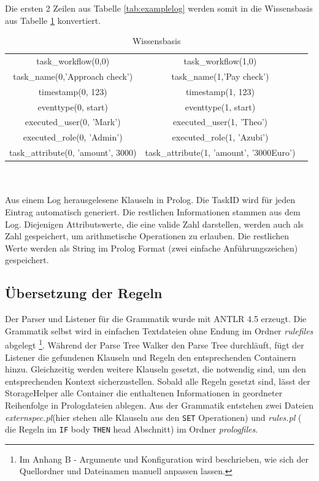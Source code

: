 Die ersten 2 Zeilen aus Tabelle \ref{tab:examplelog} werden somit in die Wissensbasis aus Tabelle \ref{tab:knowledge} konvertiert.
\begin{table}[h!]
\begin{tabular}{ccc}
task{\_}workflow(0,0)&task{\_}workflow(1,0)\\
task{\_}name(0,'Approach check')&task{\_}name(1,'Pay check')\\
timestamp(0, 123)&timestamp(1, 123)\\
eventtype(0, start)&eventtype(1, start)\\
executed{\_}user(0, 'Mark')&executed{\_}user(1, 'Theo')\\
executed{\_}role(0, 'Admin')&executed{\_}role(1, 'Azubi')\\
task\_attribute(0, 'amount', 3000)& task\_attribute(1, 'amount', '3000Euro')\\
\end{tabular}\\\\
\small Aus einem Log herausgelesene Klauseln in Prolog. Die TaskID wird für jeden Eintrag automatisch generiert. Die restlichen Informationen stammen aus dem Log. Diejenigen Attributswerte, die eine valide Zahl darstellen, werden auch als Zahl gespeichert, um arithmetische Operationen zu erlauben. Die restlichen Werte werden als String im Prolog Format (zwei einfache Anführungszeichen) gespeichert. 
\caption{Wissensbasis}
\label{tab:knowledge}
\end{table}


%
%
\subsection{Übersetzung der Regeln}
\label{sec:constraintreader}

Der Parser und Listener für die Grammatik wurde mit ANTLR 4.5 \cite{antlr} erzeugt. Die Grammatik selbst wird in einfachen Textdateien ohne Endung im Ordner \textit{rulefiles} abgelegt \footnote{Im Anhang B - Argumente und Konfiguration wird beschrieben, wie sich der Quellordner und Dateinamen manuell anpassen lassen.}. Während der Parse Tree Walker den Parse Tree durchläuft, fügt der Listener die gefundenen Klauseln und Regeln den entsprechenden Containern hinzu. Gleichzeitig werden weitere Klauseln gesetzt, die notwendig sind, um den entsprechenden Kontext sicherzustellen. Sobald alle Regeln gesetzt sind, lässt der StorageHelper alle Container die enthaltenen Informationen in geordneter Reihenfolge in Prologdateien ablegen. Aus der Grammatik entstehen zwei Dateien \textit{externspec.pl}(hier stehen alle Klauseln aus den \texttt{SET} Operationen) und \textit{rules.pl} ( die Regeln im \texttt{IF} body \texttt{THEN} head Abschnitt) im Ordner \textit{prologfiles}.\\

